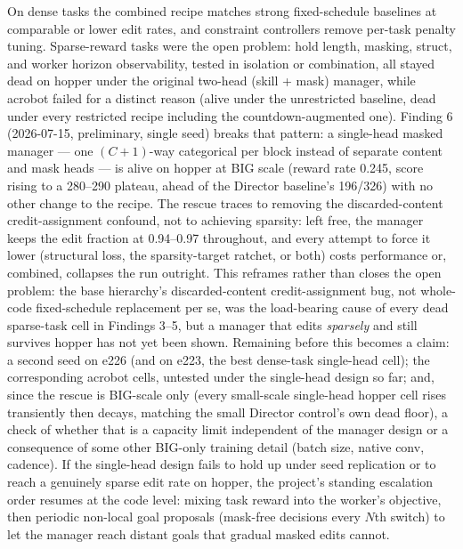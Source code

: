 \documentclass[10pt]{article}
\begin{document}
On dense tasks the combined recipe matches strong fixed-schedule baselines at
comparable or lower edit rates, and constraint controllers remove per-task
penalty tuning. Sparse-reward tasks were the open problem: hold length,
masking, struct, and worker horizon observability, tested in isolation or
combination, all stayed dead on hopper under the original two-head (skill +
mask) manager, while acrobot failed for a distinct reason (alive under the
unrestricted baseline, dead under every restricted recipe including the
countdown-augmented one). Finding 6 (2026-07-15, preliminary, single seed)
breaks that pattern: a single-head masked manager --- one $(C{+}1)$-way
categorical per block instead of separate content and mask heads --- is alive
on hopper at BIG scale (reward rate 0.245, score rising to a 280--290
plateau, ahead of the Director baseline's 196/326) with no other change to
the recipe. The rescue traces to removing the discarded-content
credit-assignment confound, not to achieving sparsity: left free, the manager
keeps the edit fraction at 0.94--0.97 throughout, and every attempt to force
it lower (structural loss, the sparsity-target ratchet, or both) costs
performance or, combined, collapses the run outright. This reframes rather
than closes the open problem: the base hierarchy's discarded-content
credit-assignment bug, not whole-code fixed-schedule replacement per se, was
the load-bearing cause of every dead sparse-task cell in Findings 3--5, but a
manager that edits \emph{sparsely} and still survives hopper has not yet been
shown. Remaining before this becomes a claim: a second seed on e226 (and on
e223, the best dense-task single-head cell); the corresponding acrobot cells,
untested under the single-head design so far; and, since the rescue is
BIG-scale only (every small-scale single-head hopper cell rises transiently
then decays, matching the small Director control's own dead floor), a check
of whether that is a capacity limit independent of the manager design or a
consequence of some other BIG-only training detail (batch size, native conv,
cadence). If the single-head design fails to hold up under seed replication
or to reach a genuinely sparse edit rate on hopper, the project's standing
escalation order resumes at the code level: mixing task reward into the
worker's objective, then periodic non-local goal proposals (mask-free
decisions every $N$th switch) to let the manager reach distant goals that
gradual masked edits cannot.
\end{document}
